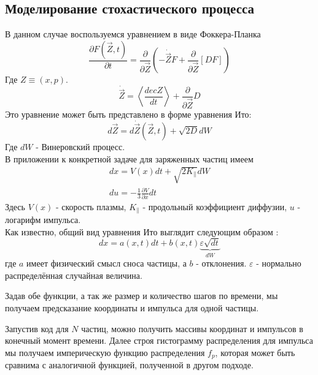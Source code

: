 \documentclass[a4paper,14pt]{extarticle} %
\begin{document}
\subsection{Моделирование стохастического процесса}

В данном случае воспользуемся уравнением в виде Фоккера-Планка\cite{Krulls}
\begin{equation}
\frac{\partial F(\vec{Z}, t)}{\partial t} = \frac{\partial}{\partial \vec{Z}}\left( -\dot{\vec{Z}}F+\frac{\partial}{\partial\vec{Z}}[DF]  \right)
\end{equation}
Где $Z\equiv (x, p)$.
\begin{equation}
\dot{\vec{Z}} = \left< \frac{dec{Z}}{dt} \right> + \frac{\partial}{\partial\vec{Z}} D
\end{equation}
Это уравнение может быть представлено в форме уравнения Ито:
\begin{equation}
d\vec{Z} = d\dot{\vec{Z}}(\vec{Z}, t)+\sqrt{2D}dW
\end{equation}
Где $dW$ - Винеровский процесс.\\
В приложении к конкретной задаче для заряженных частиц имеем
\begin{eqnarray}
dx = V(x)dt+\sqrt{2K_{\parallel}}dW\\
du = - \frac{1}{3} \frac{\partial V}{\partial x} dt
\end{eqnarray}
Здесь $V(x)$ - скорость плазмы, $K_\parallel$ - продольный коэффициент диффузии, $u$ - логарифм импульса.\\
Как известно, общий вид уравнения Ито выглядит следующим образом\cite{Ito} :
\begin{equation}
dx = a(x, t)dt + b(x,t) \underbrace{\varepsilon \sqrt{dt}}_{dW}
\end{equation}
где $a$ имеет физический смысл сноса частицы, а $b$ - отклонения. $\varepsilon$ - нормально распределённая случайная величина.

Задав обе функции, а так же размер и количество шагов по времени, мы получаем предсказание координаты и импульса для одной частицы.

Запустив код для $N$ частиц, можно получить массивы координат и импульсов в конечный момент времени. Далее строя гистограмму распределения для импульса мы получаем империческую функцию распределения $f_p$, которая может быть сравнима с аналогичной функцией, полученной в другом подходе.
\end{document}
